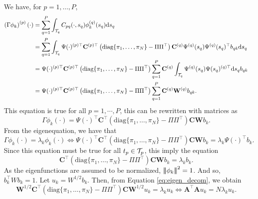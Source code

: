 We have, for $p = 1, \dots, P$,
\begin{align*}
    \left(\Gamma \phi_k\right)^{(p)}(\cdot) &= \sum_{q = 1}^P \int_{\mathcal{T}_{q}} C_{p q}(\cdot, s_q)\phi_k^{(q)}(s_q) {\rm d} s_q \\
    &= \sum_{q = 1}^P \int_{\mathcal{T}_{q}} \Psi(\cdot)^{(p) \top} \mathbf{C}^{(p) \top} \left(\text{diag}\{\pi_1, \dots, \pi_N\} - \Pi\Pi^\top\right)\mathbf{C}^{(q)} \Psi^{(q)}(s_q) \Psi^{(q)}(s_q)^\top b_{q k} {\rm d} s_q \\
    &= \Psi(\cdot)^{(p) \top} \mathbf{C}^{(p) \top} \left(\text{diag}\{\pi_1, \dots, \pi_N\} - \Pi\Pi^\top\right)\sum_{q = 1}^P \mathbf{C}^{(q)} \int_{\mathcal{T}_{q}} \Psi^{(q)}(s_q) \Psi(s_q)^{(q) \top} {\rm d} s_q b_{q k} \\
    &= \Psi(\cdot)^{(p) \top} \mathbf{C}^{(p) \top} \left(\text{diag}\{\pi_1, \dots, \pi_N\} - \Pi\Pi^\top\right) \sum_{q = 1}^P \mathbf{C}^{(q)} \mathbf{W}^{(q)} b_{q k}. \\
\end{align*}
This equation is true for all $p = 1, \cdots, P$, this can be rewritten with matrices as
\begin{equation}
    \Gamma \phi_k(\cdot) = \Psi(\cdot)^{\top} \mathbf{C}^{\top} \left(\text{diag}\{\pi_1, \dots, \pi_N\} - \Pi\Pi^\top\right) \mathbf{C} \mathbf{W} b_{k}.
\end{equation}
From the eigenequation, we have that
\begin{equation}
    \Gamma \phi_k(\cdot) = \lambda_k \phi_k(\cdot) \Longleftrightarrow \Psi(\cdot)^{\top} \mathbf{C}^{\top} \left(\text{diag}\{\pi_1, \dots, \pi_N\} - \Pi\Pi^\top\right) \mathbf{C} \mathbf{W} b_{k} = \lambda_k \Psi(\cdot)^\top b_k.
\end{equation}
Since this equation must be true for all $t_p \in \mathcal{T}_{p}$, this imply the equation
\begin{equation}\label{eq:eigen_decom}
    \mathbf{C}^{\top} \left(\text{diag}\{\pi_1, \dots, \pi_N\} - \Pi\Pi^\top\right) \mathbf{C} \mathbf{W} b_{k} = \lambda_k b_k.
\end{equation}
As the eigenfunctions are assumed to be normalized, $\left|\!\left|\!\left|\phi_k\right|\!\right|\!\right|^2 = 1$. And so, $b_k^\top W b_k = 1$. Let $u_k = W^{1/2}b_k$. Then, from Equation \eqref{eq:eigen_decom}, we obtain
\begin{equation}\label{eq:eigen_cov_op}
    \mathbf{W}^{1/2} \mathbf{C}^{\top} \left(\text{diag}\{\pi_1, \dots, \pi_N\} - \Pi\Pi^\top\right) \mathbf{C} \mathbf{W}^{1/2} u_k = \lambda_k u_k \Longleftrightarrow \mathbf{A}^\top\mathbf{A} u_k = N\lambda_k u_k.
\end{equation}
